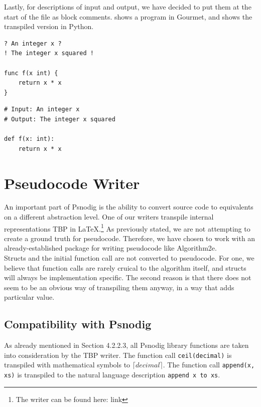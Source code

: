 Lastly, for descriptions of input and output, we have decided to put them at the start of the file as block comments.  shows a program in Gourmet, and  shows the transpiled version in Python. \\

\begin{lstlisting}[caption={A Gourmet function where an input variable gets squared and returned.}, captionpos=b, label={gourmetSquareVariable}]
? An integer x ?
! The integer x squared !

func f(x int) {
    return x * x
}
\end{lstlisting}

\begin{lstlisting}[caption={The result of transpiling \Cref{gourmetSquareVariable} to Python with Psnodig}, captionpos=b, label={PythonResult}]
# Input: An integer x 
# Output: The integer x squared 

def f(x: int):
    return x * x
\end{lstlisting}

\section{Pseudocode Writer}

An important part of Psnodig is the ability to convert source code to equivalents on a different abstraction level. One of our writers transpile internal representations TBP in LaTeX.\footnote{The writer can be found here: link} As previously stated, we are not attempting to create a ground truth for pseudocode. Therefore, we have chosen to work with an already-established package for writing pseudocode like Algorithm2e. \\

Structs and the initial function call are not converted to pseudocode. For one, we believe that function calls are rarely cruical to the algorithm itself, and structs will always be implementation specific. The second reason is that there does not seem to be an obvious way of transpiling them anyway, in a way that adds particular value.

\subsection{Compatibility with Psnodig}

As already mentioned in Section 4.2.2.3, all Psnodig library functions are taken into consideration by the TBP writer. The function call \texttt{ceil(decimal)} is transpiled with mathematical symbols to $\lceil decimal \rceil$. The function call \texttt{append(x, xs)} is transpiled to the natural language description \texttt{append x to xs}. \\


